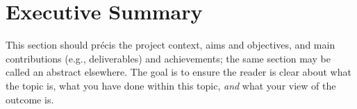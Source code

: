 \documentclass[ %
                    author={Lucas O'Dowd-Jones},
                supervisor={Dr. Alex Kavvos},
                    degree={MEng},
                     title={Variations on Normalisation by Evaluation in Haskell},
                  subtitle={},
                      type={programming languages},
                      year={2021}]{dissertation}
\begin{document}



\maketitle


\frontmatter


\makedecl


\tableofcontents




\chapter*{Executive Summary}


\noindent
This section should pr\'{e}cis the project context, aims and objectives,
and main contributions (e.g., deliverables) and achievements; the same 
section may be called an abstract elsewhere.  The goal is to ensure the 
reader is clear about what the topic is, what you have done within this 
topic, {\em and} what your view of the outcome is.
\end{document}
